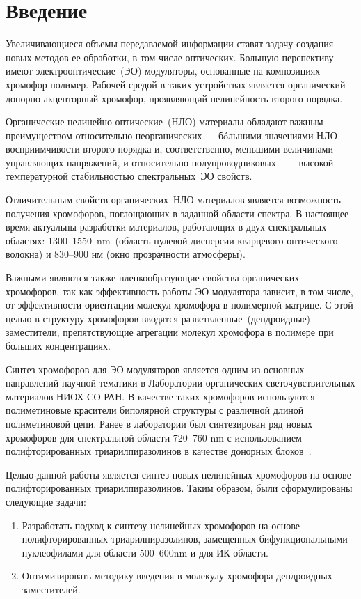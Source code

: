 \section{Введение}

Увеличивающиеся объемы передаваемой информации ставят задачу создания новых методов ее обработки, в том числе оптических. Большую перспективу имеют электрооптические~(ЭО) модуляторы, основанные на композициях хромофор-полимер. Рабочей средой в таких устройствах является органический донорно-акцепторный хромофор, проявляющий нелинейность второго порядка.

Органические нелинейно-оптические~(НЛО) материалы обладают важным преимуществом относительно неорганических — бóльшими значениями НЛО восприимчивости второго порядка и, соответственно, меньшими величинами управляющих напряжений, и относительно полупроводниковых~—-- высокой температурной стабильностью спектральных~ЭО свойств.

Отличительным свойств органических~НЛО материалов является возможность получения хромофоров, поглощающих в заданной области спектра. В настоящее время актуальны разработки материалов, работающих в двух спектральных областях: 1300--1550~\si{\nano\metre}~(область нулевой дисперсии кварцевого оптического волокна) и 830--900 нм (окно прозрачности атмосферы).

Важными являются также пленкообразующие свойства органических хромофоров, так как эффективность работы ЭО модулятора зависит, в том числе, от эффективности ориентации молекул хромофора в полимерной матрице. С этой целью в структуру хромофоров вводятся разветвленные~(дендроидные) заместители, препятствующие агрегации молекул хромофора в полимере при больших концентрациях.

Синтез хромофоров для ЭО модуляторов является одним из основных направлений научной тематики в Лаборатории органических светочувствительных материалов НИОХ СО РАН. В качестве таких хромофоров используются полиметиновые красители биполярной структуры с различной длиной полиметиновой цепи. Ранее в лаборатории был синтезирован ряд новых хромофоров для спектральной области 720--760 \si{\nano\metre} с использованием полифторированных триарилпиразолинов в качестве донорных блоков~\cite{2019}. 

Целью данной работы является синтез новых нелинейных хромофоров на основе полифторированных триарилпиразолинов. Таким образом, были сформулированы следующие задачи:
\begin{enumerate}
    \item Разработать подход к синтезу нелинейных хромофоров на основе полифторированных триарилпиразолинов, замещенных бифункциональными нуклеофилами для области 500--600\si{\nano\metre} и для ИК-области.
    \item Оптимизировать методику введения в молекулу хромофора дендроидных заместителей.
\end{enumerate} 
